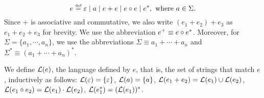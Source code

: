 \begin{definition}
	\[e \eqdef \varepsilon \mid a \mid e + e \mid e \concat e \mid e^*, \mbox{ where } a \in \Sigma. \]
	Since $+$ is associative and commutative, we also write $(e_1 + e_2) + e_3$ as $e_1 + e_2 + e_3$ for brevity. We use the abbreviation $e^+ \equiv e \circ e^*$. Moreover, for $\Sigma = \{a_1, \cdots, a_n\}$, we use the abbreviations $\Sigma \equiv a_1 + \cdots + a_n$ and $\Sigma^\ast \equiv (a_1 + \cdots + a_n)^\ast$. 
\end{definition}
We define $\mathcal{L}(e)$, the language defined by $e$, that is, the set of strings that match $e$, inductively as follows: 
$\mathcal{L}(\varepsilon) =\{\varepsilon\}$,
%
$\mathcal{L}(a)= \{a\}$,
%
$\mathcal{L}(e_1 + e_2) = \mathcal{L}(e_1) \cup \mathcal{L}(e_2)$,
%
$\mathcal{L}(e_1 \circ e_2) = \mathcal{L}(e_1) \cdot \mathcal{L}(e_2)$,
%
$\mathcal{L}(e_1^*)=(\mathcal{L}(e_1))^*$.



